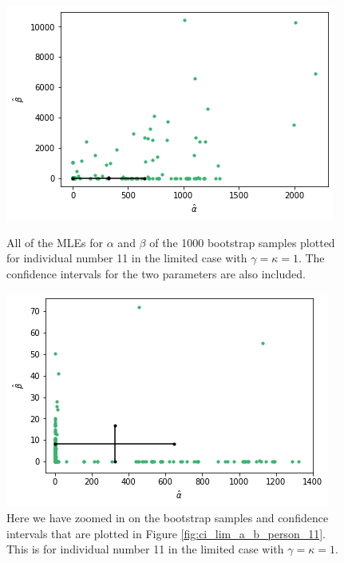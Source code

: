 \begin{figure}
    \centering
    \begin{minipage}{0.48\textwidth}
        \centering
        \includegraphics[scale=0.37]{pictures/ci_lim_a_b_person11.png}
        \caption[MLEs for $\alpha$ and $\beta$ for bootstrap samples individual 11, limited]{All of the MLEs for $\alpha$ and $\beta$ of the 1000 bootstrap samples plotted for individual number 11 in the limited case with $\gamma=\kappa=1$. The confidence intervals for the two parameters are also included.}
        \label{fig:ci_lim_a_b_person_11}
    \end{minipage}\hfill
    \begin{minipage}{0.48\textwidth}
        \centering
        \includegraphics[scale=0.37]{pictures/ci_lim_a_b_person11_zoomed.png}
        \caption[MLEs for $\alpha$ and $\beta$ of bootstrap samples individual 11, limited, zoomed]{Here we have zoomed in on the bootstrap samples and confidence intervals that are plotted in Figure \ref{fig:ci_lim_a_b_person_11}. This is for individual number 11 in the limited case with $\gamma=\kappa=1$.}
        \label{fig:ci_lim_a_b_person_11_zoomed}
    \end{minipage}
\end{figure}

